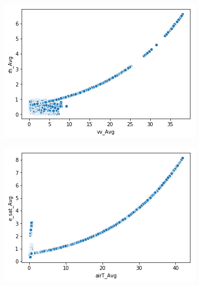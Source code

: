 \documentclass[11pt, spanish]{report}
\begin{document}
\begin{figure}
\centering
\begin{minipage}{.5\textwidth}
  \centering
  \includegraphics[width=\linewidth]{5.png}
  \label{fig:test1}
\end{minipage}%
\begin{minipage}{.5\textwidth}
  \centering
  \includegraphics[width=\linewidth]{6.png}
  \label{fig:test2}
\end{minipage}
\end{figure}
\end{document}
